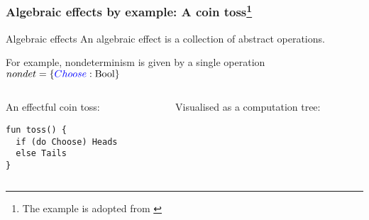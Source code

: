 \documentclass[10pt,compress]{beamer}
\begin{document}
\begin{frame}[fragile]
  \frametitle{Algebraic effects by example: A coin toss\footnote{The example is adopted from \citet{Kammar2013}}}
  \begin{block}{Algebraic effects}
    An algebraic effect is a collection of abstract operations.    
  \end{block}
For example, nondeterminism is given by a single operation $nondet = \{{\color{blue}{Choose}} : \text{Bool}\}$
\vspace{1cm}
\begin{columns}
\begin{column}{0.5\textwidth}
An effectful coin toss:
\begin{lstlisting}
fun toss() {
  if (do Choose) Heads
  else Tails
} 
\end{lstlisting}
\end{column}
\begin{column}{0.5\textwidth}
Visualised as a computation tree:
\end{column}
\end{columns}
\end{frame}
\end{document}
